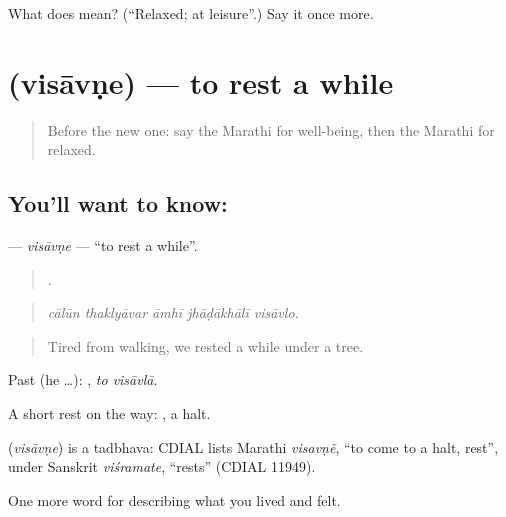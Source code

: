 \begin{tcolorbox}[breakable,colback=teal!4,colframe=teal!35!black,title={Before you move on}]
What does  mean? (\textquotedblleft{}Relaxed; at leisure\textquotedblright{}.) Say it once more.
\end{tcolorbox}
\section[\texorpdfstring{\mr{विसावणे} (visāvṇe)}{विसावणे (visāvṇe)}]{ (visāvṇe) — to rest a while}

\label{lesson:MR-C466-visavne}



\begin{quote}
Before the new one: say the Marathi for well-being, then the Marathi for relaxed.
\end{quote}

\subsection*{You'll want to know: }
\textbf{} — \emph{visāvṇe} — \textquotedblleft{}to rest a while\textquotedblright{}.

\begin{quote}
    .
\end{quote}

\begin{quote}
\emph{cālūn thaklyāvar āmhī jhāḍākhālī visāvlo.}
\end{quote}

\begin{quote}
Tired from walking, we rested a while under a tree.
\end{quote}

Past (he …):  , \emph{to visāvlā}.

A short rest on the way: , a halt.

\begin{cousinweb}
\textbf{} (\emph{visāvṇe}) is a tadbhava: CDIAL lists Marathi \emph{visavṇẽ}, \textquotedblleft{}to come to a halt, rest\textquotedblright{}, under Sanskrit \emph{viśramate}, \textquotedblleft{}rests\textquotedblright{} (CDIAL 11949).
\end{cousinweb}

\begin{grammarlens}[title={What you've built}]
One more word for describing what you lived and felt.
\end{grammarlens}

